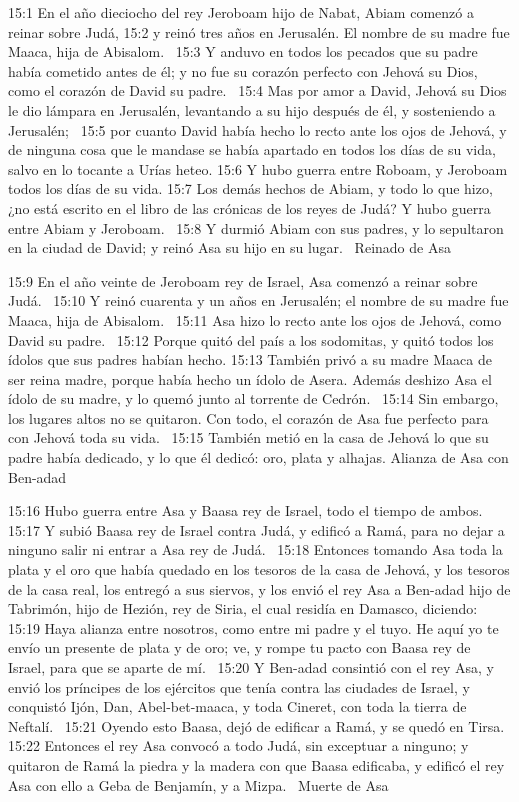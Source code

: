 15:1 En el año dieciocho del rey Jeroboam hijo de Nabat, Abiam comenzó a reinar sobre Judá, 
15:2 y reinó tres años en Jerusalén. El nombre de su madre fue Maaca, hija de Abisalom.  
15:3 Y anduvo en todos los pecados que su padre había cometido antes de él; y no fue su corazón perfecto con Jehová su Dios, como el corazón de David su padre.  
15:4 Mas por amor a David, Jehová su Dios le dio lámpara en Jerusalén, levantando a su hijo después de él, y sosteniendo a Jerusalén;  
15:5 por cuanto David había hecho lo recto ante los ojos de Jehová, y de ninguna cosa que le mandase se había apartado en todos los días de su vida, salvo en lo tocante a Urías heteo. 
15:6 Y hubo guerra entre Roboam, y Jeroboam todos los días de su vida. 
15:7 Los demás hechos de Abiam, y todo lo que hizo, ¿no está escrito en el libro de las crónicas de los reyes de Judá? Y hubo guerra entre Abiam y Jeroboam.  
15:8 Y durmió Abiam con sus padres, y lo sepultaron en la ciudad de David; y reinó Asa su hijo en su lugar.  
Reinado de Asa  

15:9 En el año veinte de Jeroboam rey de Israel, Asa comenzó a reinar sobre Judá.  
15:10 Y reinó cuarenta y un años en Jerusalén; el nombre de su madre fue Maaca, hija de Abisalom.  
15:11 Asa hizo lo recto ante los ojos de Jehová, como David su padre.  
15:12 Porque quitó del país a los sodomitas, y quitó todos los ídolos que sus padres habían hecho. 
15:13 También privó a su madre Maaca de ser reina madre, porque había hecho un ídolo de Asera. Además deshizo Asa el ídolo de su madre, y lo quemó junto al torrente de Cedrón.  
15:14 Sin embargo, los lugares altos no se quitaron. Con todo, el corazón de Asa fue perfecto para con Jehová toda su vida.  
15:15 También metió en la casa de Jehová lo que su padre había dedicado, y lo que él dedicó: oro, plata y alhajas. 
Alianza de Asa con Ben-adad  

15:16 Hubo guerra entre Asa y Baasa rey de Israel, todo el tiempo de ambos.  
15:17 Y subió Baasa rey de Israel contra Judá, y edificó a Ramá, para no dejar a ninguno salir ni entrar a Asa rey de Judá.  
15:18 Entonces tomando Asa toda la plata y el oro que había quedado en los tesoros de la casa de Jehová, y los tesoros de la casa real, los entregó a sus siervos, y los envió el rey Asa a Ben-adad hijo de Tabrimón, hijo de Hezión, rey de Siria, el cual residía en Damasco, diciendo:  
15:19 Haya alianza entre nosotros, como entre mi padre y el tuyo. He aquí yo te envío un presente de plata y de oro; ve, y rompe tu pacto con Baasa rey de Israel, para que se aparte de mí.  
15:20 Y Ben-adad consintió con el rey Asa, y envió los príncipes de los ejércitos que tenía contra las ciudades de Israel, y conquistó Ijón, Dan, Abel-bet-maaca, y toda Cineret, con toda la tierra de Neftalí.  
15:21 Oyendo esto Baasa, dejó de edificar a Ramá, y se quedó en Tirsa.  
15:22 Entonces el rey Asa convocó a todo Judá, sin exceptuar a ninguno; y quitaron de Ramá la piedra y la madera con que Baasa edificaba, y edificó el rey Asa con ello a Geba de Benjamín, y a Mizpa.  
Muerte de Asa  

